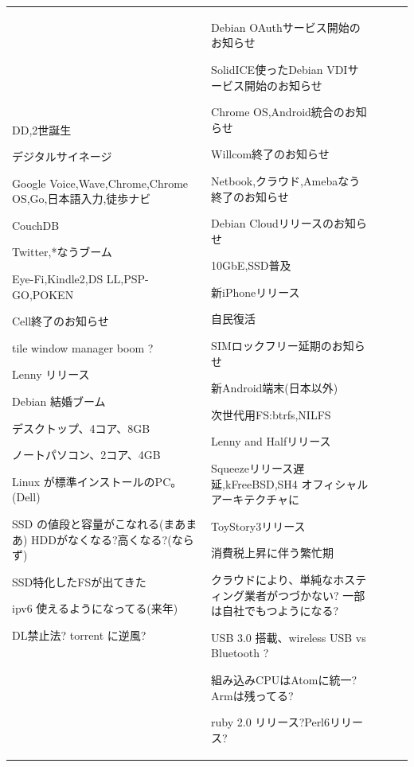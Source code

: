 \documentclass[mingoth,a4paper]{jsarticle}
\begin{document}
{\begin{tabular}[t]{|p{8em}|p{8em}|p{12em}|p{8em}|p{8em}|}
DD,2世誕生

デジタルサイネージ

Google Voice,Wave,Chrome,Chrome OS,Go,日本語入力,徒歩ナビ

CouchDB

Twitter,*なうブーム

Eye-Fi,Kindle2,DS LL,PSP-GO,POKEN

Cell終了のお知らせ

tile window manager boom ?

Lenny リリース

Debian 結婚ブーム

デスクトップ、4コア、8GB

ノートパソコン、2コア、4GB

Linux が標準インストールのPC。(Dell)

SSD の値段と容量がこなれる(まあまあ)
HDDがなくなる?高くなる?(ならず)

SSD特化したFSが出てきた

ipv6 使えるようになってる(来年)

DL禁止法? torrent に逆風?

&
Debian OAuthサービス開始のお知らせ

SolidICE使ったDebian VDIサービス開始のお知らせ

Chrome OS,Android統合のお知らせ

Willcom終了のお知らせ

Netbook,クラウド,Amebaなう終了のお知らせ

Debian Cloudリリースのお知らせ

10GbE,SSD普及

新iPhoneリリース

自民復活

SIMロックフリー延期のお知らせ

新Android端末(日本以外)

次世代用FS:btrfs,NILFS

Lenny and Halfリリース

Squeezeリリース遅延,kFreeBSD,SH4 オフィシャルアーキテクチャに

ToyStory3リリース

消費税上昇に伴う繁忙期

クラウドにより、単純なホスティング業者がつづかない?
一部は自社でもつようになる?

USB 3.0 搭載、wireless USB vs Bluetooth ?

組み込みCPUはAtomに統一?Armは残ってる?

ruby 2.0 リリース?Perl6リリース?


\end{tabular}}
\end{document}
